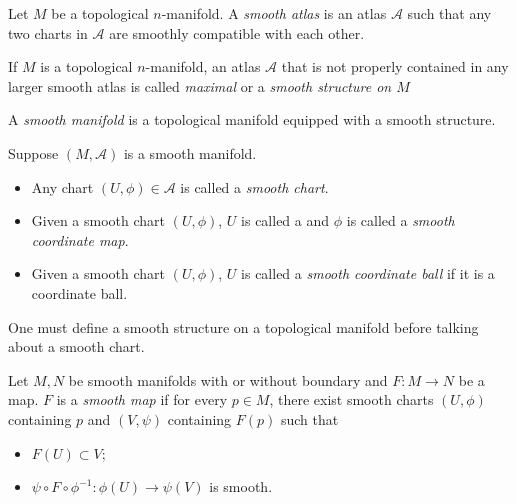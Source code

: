 \begin{defn}
  Let $M$ be a topological $n$-manifold.
  A \textit{smooth atlas} is an atlas $\mathcal{A}$ such that any two charts in $\mathcal{A}$ are smoothly compatible with each other.
\end{defn}

\begin{defn}
  If $M$ is a topological $n$-manifold, an atlas $\mathcal{A}$ that is not properly contained in any larger smooth atlas is called \textit{maximal} or a \textit{smooth structure on $M$}
\end{defn}

\begin{defn}
  A \textit{smooth manifold} is a topological manifold equipped with a smooth structure.
\end{defn}

\begin{defn}
  Suppose $(M, \mathcal{A})$ is a smooth manifold.
  \begin{itemize}
    \item
      Any chart $(U, \phi) \in \mathcal{A}$ is called a \textit{smooth chart}.
    \item
      Given a smooth chart $(U, \phi)$, $U$ is called a  and $\phi$ is called a \textit{smooth coordinate map}.
    \item
      Given a smooth chart $(U, \phi)$, $U$ is called a \textit{smooth coordinate ball} if it is a coordinate ball.
  \end{itemize}
\end{defn}

\begin{rem}
  One must define a smooth structure on a topological manifold before talking about a smooth chart.
\end{rem}

\begin{defn}
  Let $M, N$ be smooth manifolds with or without boundary and $F: M \rightarrow N$ be a map.
  $F$ is a \textit{smooth map} if for every $p \in M$, there exist smooth charts $(U, \phi)$ containing $p$ and $(V, \psi)$ containing $F(p)$ such that
  \begin{itemize}
    \item
      $F(U) \subset V$;
    \item
      $\psi \circ F \circ \phi^{-1}: \phi(U) \rightarrow \psi(V)$ is smooth.
  \end{itemize}
\end{defn}

